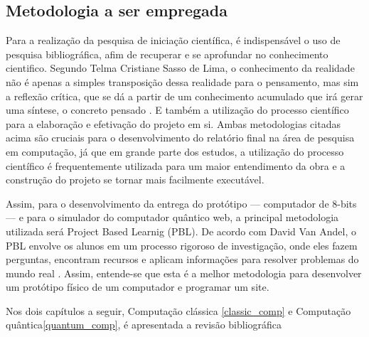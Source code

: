 \subsection{Metodologia a ser empregada}
Para a realização da pesquisa de iniciação científica, é indispensável o uso de pesquisa bibliográfica, afim de recuperar e se aprofundar no conhecimento cientifico. Segundo Telma Cristiane Sasso de Lima, o conhecimento da realidade não é apenas a simples transposição dessa realidade para o pensamento, mas sim a reflexão crítica, que se dá a partir de um conhecimento acumulado que irá gerar uma síntese, o concreto pensado \cite{1}. E também a utilização do processo científico para a elaboração e efetivação do projeto em si. Ambas metodologias citadas acima são cruciais para o desenvolvimento do relatório final na área de pesquisa em computação, já que em grande parte dos estudos, a utilização do processo científico é frequentemente utilizada para um maior entendimento da obra e a construção do projeto se tornar mais facilmente executável.

Assim, para o desenvolvimento da entrega do protótipo — computador de 8-bits — e para o simulador do computador quântico web, a principal metodologia utilizada será Project Based Learnig (PBL). De acordo com David Van Andel, o PBL envolve os alunos em um processo rigoroso de investigação, onde eles fazem perguntas, encontram recursos e aplicam informações para resolver problemas do mundo real \cite{3}. Assim, entende-se que esta é a melhor metodologia para desenvolver um protótipo físico de um computador e programar um site.

Nos dois capítulos a seguir, Computação clássica \ref{classic_comp} e Computação quântica\ref{quantum_comp}, é apresentada a revisão bibliográfica 
\newpage

